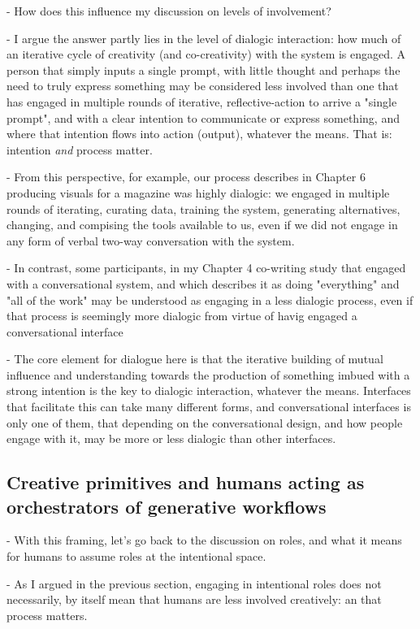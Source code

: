 - How does this influence my discussion on levels of involvement? 

- I argue the answer partly lies in the level of dialogic interaction: how much of an iterative cycle of creativity (and co-creativity) with the system is engaged. A person that simply inputs a single prompt, with little thought and perhaps the need to truly express something may be considered less involved than one that has engaged in multiple rounds of iterative, reflective-action to arrive a "single prompt", and with a clear intention to communicate or express something, and where that intention flows into action (output), whatever the means. That is: intention \textit{and} process matter.

- From this perspective, for example, our process describes in Chapter 6 producing visuals for a magazine was highly dialogic: we engaged in multiple rounds of iterating, curating data, training the system, generating alternatives, changing, and compising the tools available to us, even if we did not engage in any form of verbal two-way conversation with the system. 

- In contrast, some participants, in my Chapter 4 co-writing study that engaged with a conversational system, and which describes it as doing "everything" and "all of the work" may be understood as engaging in a less dialogic process, even if that process is seemingly more dialogic from virtue of havig engaged a conversational interface

- The core element for dialogue here is that the iterative building of mutual influence and understanding towards the production of something imbued with a strong intention is the key to dialogic interaction, whatever the means. Interfaces that facilitate this can take many different forms, and conversational interfaces is only one of them, that depending on the conversational design, and how people engage with it, may be more or less dialogic than other interfaces.

\subsection{Creative primitives and humans acting as orchestrators of generative workflows}

- With this framing, let's go back to the discussion on roles, and what it means for humans to assume roles at the intentional space.

- As I argued in the previous section, engaging in intentional roles does not necessarily, by itself mean that humans are less involved creatively: an that process matters.

